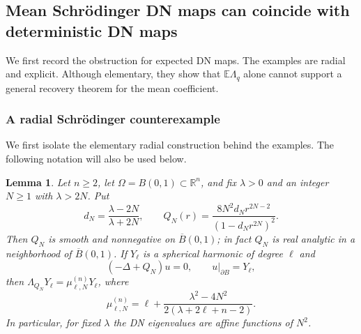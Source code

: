 \documentclass[11pt]{article}
\newcommand{\OmegaD}{\Omega}
\newcommand{\R}{\mathbb R}
\newcommand{\E}{\mathbb E}
\theoremstyle{plain}
\newtheorem{lemma}[theorem]{Lemma}
\theoremstyle{definition}
\theoremstyle{remark}
\begin{document}
\subsection{Mean Schr\"odinger DN maps can coincide with deterministic DN maps}
\label{sec:DN-counterexamples}

We first record the obstruction for expected DN maps.  The examples are radial and explicit.  Although elementary, they show that $\E\Lambda_q$ alone cannot support a general recovery theorem for the mean coefficient.

\subsubsection{A radial Schr\"odinger counterexample}

We first isolate the elementary radial construction behind the examples.  The following notation will also be used below.

\begin{lemma}\label{lem:radial-affine-family}
Let $n\ge2$, let $\OmegaD=B(0,1)\subset\R^n$, and fix $\lambda>0$ and an integer $N\ge1$ with $\lambda>2N$.  Put
\begin{equation}\label{eq:QN-family}
  d_N=\frac{\lambda-2N}{\lambda+2N},
  \qquad
  Q_N(r)=\frac{8N^2d_Nr^{2N-2}}{(1-d_Nr^{2N})^2}.
\end{equation}
Then $Q_N$ is smooth and nonnegative on $\overline B(0,1)$; in fact $Q_N$ is real analytic in a neighborhood of $\overline B(0,1)$.  If $Y_{\ell}$ is a spherical harmonic of degree $\ell$ and
\[
  (-\Delta+Q_N)u=0,\qquad u|_{\partial B}=Y_{\ell},
\]
then $\Lambda_{Q_N}Y_{\ell}=\mu_{\ell,N}^{(n)}Y_{\ell}$, where
\begin{equation}\label{eq:mu-N-formula-general}
  \mu_{\ell,N}^{(n)}
  =\ell+\frac{\lambda^2-4N^2}{2(\lambda+2\ell+n-2)}.
\end{equation}
In particular, for fixed $\lambda$ the DN eigenvalues are affine functions of $N^2$.
\end{lemma}
\end{document}
